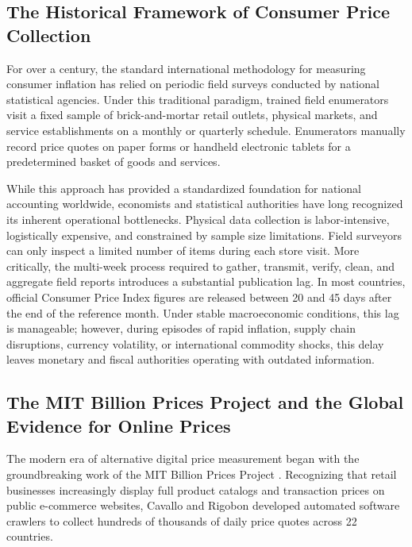 \subsection{The Historical Framework of Consumer Price Collection}
\hs For over a century, the standard international methodology for measuring consumer inflation has relied on periodic field surveys conducted by national statistical agencies. Under this traditional paradigm, trained field enumerators visit a fixed sample of brick-and-mortar retail outlets, physical markets, and service establishments on a monthly or quarterly schedule. Enumerators manually record price quotes on paper forms or handheld electronic tablets for a predetermined basket of goods and services.

\hs While this approach has provided a standardized foundation for national accounting worldwide, economists and statistical authorities have long recognized its inherent operational bottlenecks. Physical data collection is labor-intensive, logistically expensive, and constrained by sample size limitations. Field surveyors can only inspect a limited number of items during each store visit. More critically, the multi-week process required to gather, transmit, verify, clean, and aggregate field reports introduces a substantial publication lag. In most countries, official Consumer Price Index figures are released between 20 and 45 days after the end of the reference month. Under stable macroeconomic conditions, this lag is manageable; however, during episodes of rapid inflation, supply chain disruptions, currency volatility, or international commodity shocks, this delay leaves monetary and fiscal authorities operating with outdated information.

\subsection{The MIT Billion Prices Project and the Global Evidence for Online Prices}
\hs The modern era of alternative digital price measurement began with the groundbreaking work of the MIT Billion Prices Project \citep{cavallo2016billion}. Recognizing that retail businesses increasingly display full product catalogs and transaction prices on public e-commerce websites, Cavallo and Rigobon developed automated software crawlers to collect hundreds of thousands of daily price quotes across 22 countries.

